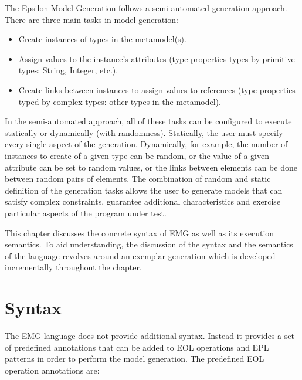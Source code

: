 The Epsilon Model Generation follows a semi-automated generation approach. There are three main tasks in model generation:
\begin{itemize}
    \item Create instances of types in the metamodel(s).
    \item Assign values to the instance's attributes (type properties types by primitive types: String, Integer, etc.).
    \item Create links between instances to assign values to references (type properties typed by complex types: other types in the metamodel). 
\end{itemize}

In the semi-automated approach, all of these tasks can be configured to execute statically or dynamically (with randomness). Statically, the user must specify every single aspect of the generation. Dynamically, for example, the number of instances to create of a given type can be random, or the value of a given attribute can be set to random values, or the links between elements can be done between random pairs of elements. The combination of random and static definition of the generation tasks allows the user to generate models that can satisfy complex constraints, guarantee additional characteristics and exercise particular aspects of the program under test.  

This chapter discusses the concrete syntax of EMG as well as its execution semantics. To aid understanding, the discussion of the syntax and the semantics of the language revolves around an exemplar generation which is developed incrementally throughout the chapter. 

\section{Syntax}

The EMG language does not provide additional syntax. Instead it provides a set of predefined annotations that can be added to EOL operations and EPL patterns in order to perform the model generation. The predefined EOL operation annotations are:

